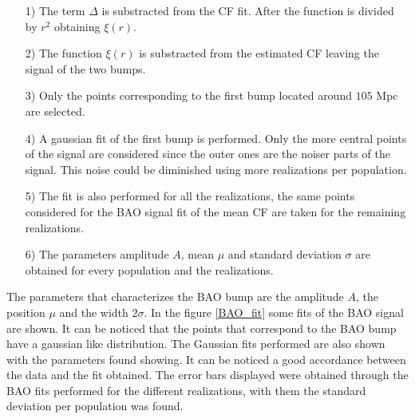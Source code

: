 \begin{itemize}

\item[1)] The term $\Delta$ is substracted from the CF fit. After the function
is divided by $r^2$ obtaining $\xi(r)$. 

\item[2)] The function $\xi(r)$ is substracted from the estimated CF leaving
the signal of the two bumps. 

\item[3)] Only the points corresponding to the first bump located around $105$ Mpc 
are selected. 

\item[4)] A gaussian fit of the first bump is performed. Only the more central points
of the signal are considered since the outer ones are the noiser parts of the signal. This noise 
could be diminished using more realizations per population. 

\item[5)] The fit is also performed for all the realizations, the same points
considered for the BAO signal fit of the mean CF are taken for the remaining realizations. 

\item[6)] The parameters amplitude $A$, mean $\mu$ and standard deviation $\sigma$ are
obtained for every population and the realizations. 

\end{itemize}

The parameters that characterizes the BAO bump are the amplitude $A$, the position
$\mu$ and the width $2\sigma$. In the figure \ref{BAO_fit} some fits of the BAO
signal are shown. It can be noticed that the points that correspond to the BAO
bump have a gaussian like distribution. The Gaussian fits performed are also shown
with the parameters found showing. It can be noticed a good accordance between 
the data and the fit obtained. 
The error bars displayed were obtained through the BAO fits performed for the
different realizations, with them the standard deviation per population was found.  


